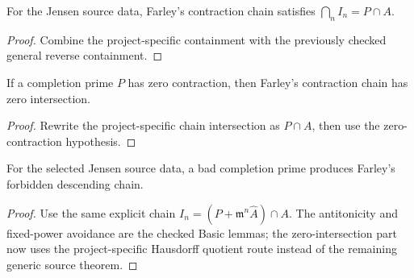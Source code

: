 \begin{lemma}
  \label{lem:bad_quotient_source_data_bad_prime_contraction_chain_iinf_eq_comap_source}
  For the Jensen source data, Farley's contraction chain satisfies
  \(\bigcap_n I_n=P\cap A\).
\end{lemma}

\begin{proof}
  Combine the project-specific containment with the previously checked
  general reverse containment.
\end{proof}

\begin{lemma}
  \label{lem:bad_quotient_source_data_bad_prime_contraction_chain_iinf_eq_bot_source}
  If a completion prime \(P\) has zero contraction, then Farley's contraction
  chain has zero intersection.
\end{lemma}

\begin{proof}
  Rewrite the project-specific chain intersection as \(P\cap A\), then use the
  zero-contraction hypothesis.
\end{proof}

\begin{lemma}
  \label{lem:bad_quotient_source_data_adic_completion_bad_prime_to_bad_chain_source}
  For the selected Jensen source data, a bad completion prime produces
  Farley's forbidden descending chain.
\end{lemma}

\begin{proof}
  Use the same explicit chain \(I_n=(P+\mathfrak m^n\widehat A)\cap A\).
  The antitonicity and fixed-power avoidance are the checked Basic lemmas; the
  zero-intersection part now uses the project-specific Hausdorff quotient
  route instead of the remaining generic source theorem.
\end{proof}


